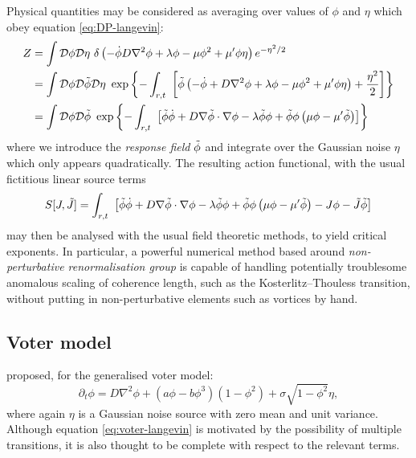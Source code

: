 \documentclass[10pt,english]{report}
\begin{document}
Physical quantities may be considered as averaging over values of $\phi$ and $\eta$ which obey equation \eqref{eq:DP-langevin}:
\begin{align*}
Z &= \int \mathcal{D}\phi \mathcal{D}\eta~\delta\left(-\dot \phi D \nabla^2 \phi + \lambda \phi - \mu \phi^2 + \mu^\prime \phi \eta \right) e^{-\eta^2/2} \\
&= \int \mathcal{D}\phi \mathcal{D}\tilde \phi \mathcal{D}\eta~\exp\left\{-\int_{r,t}~\left[\tilde \phi \left(-\dot \phi + D \nabla^2 \phi + \lambda \phi - \mu \phi^2 + \mu^\prime \phi \eta \right) + \frac{\eta^2}{2} \right] \right\} \\
&= \int \mathcal{D}\phi \mathcal{D}\tilde \phi~\exp\left\{-\int_{r,t}~\left[\tilde \phi\dot{\phi} + D \nabla \tilde \phi \cdot \nabla \phi - \lambda\tilde \phi\phi + \tilde \phi\phi\left(\mu\phi - \mu^\prime\tilde \phi \right) \right] \right\} 
\end{align*}
where we introduce the \emph{response field} $\tilde \phi$ and integrate over the Gaussian noise $\eta$ which only appears quadratically. The resulting action functional, with the usual fictitious linear source terms
\begin{equation}
S[J,\tilde J] = \int_{r,t}~\left[\tilde \phi\dot{\phi} + D \nabla \tilde \phi \cdot \nabla \phi - \lambda\tilde \phi\phi + \tilde \phi\phi\left(\mu\phi - \mu^\prime\tilde \phi \right) - J\phi - \tilde J\tilde \phi \right]
\end{equation}
may then be analysed with the usual field theoretic methods, to yield critical exponents. In particular, a powerful numerical method based around \emph{non-perturbative renormalisation group} \citep{DPnprg} is capable of handling potentially troublesome anomalous scaling of coherence length, such as the Kosterlitz--Thouless transition, without putting in non-perturbative elements such as vortices by hand.

\subsection{Voter model}

\citet{voterlangevin} proposed, for the generalised voter model:
\begin{equation}
\partial_t \phi = D \nabla^2 \phi + (a \phi - b \phi^3)(1-\phi^2) + \sigma \sqrt{1-\phi^2} \eta, \label{eq:voter-langevin}
\end{equation}
where again $\eta$ is a Gaussian noise source with zero mean and unit variance. Although equation \eqref{eq:voter-langevin} is motivated by the possibility of multiple transitions, it is also thought to be complete with respect to the relevant terms.
\end{document}
